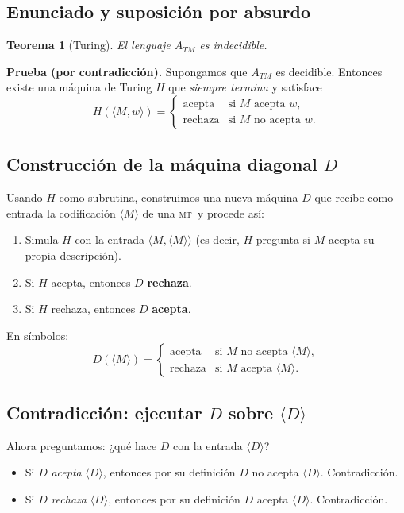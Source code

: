 \documentclass[11pt,a4paper]{article}
\theoremstyle{definicion}
\newtheorem{teorema}[definicion]{Teorema}
\newcommand{\MT}{\textsc{mt}}
\newcommand{\enc}[1]{\langle #1 \rangle}
\begin{document}
\subsection{Enunciado y suposición por absurdo}

\begin{teorema}[Turing]
El lenguaje $A_{TM}$ es indecidible.
\end{teorema}

\textbf{Prueba (por contradicción).} Supongamos que $A_{TM}$ es decidible. Entonces existe una máquina de Turing $H$ que \emph{siempre termina} y satisface
\[
H(\enc{M, w}) = \begin{cases} \text{acepta} & \text{si } M \text{ acepta } w, \\ \text{rechaza} & \text{si } M \text{ no acepta } w. \end{cases}
\]

\subsection{Construcción de la máquina diagonal $D$}

Usando $H$ como subrutina, construimos una nueva máquina $D$ que recibe como entrada la codificación $\enc{M}$ de una \MT\ y procede así:
\begin{enumerate}
    \item Simula $H$ con la entrada $\enc{M, \enc{M}}$ (es decir, $H$ pregunta si $M$ acepta su propia descripción).
    \item Si $H$ acepta, entonces $D$ \textbf{rechaza}.
    \item Si $H$ rechaza, entonces $D$ \textbf{acepta}.
\end{enumerate}

En símbolos:
\[
D(\enc{M}) = \begin{cases} \text{acepta} & \text{si } M \text{ no acepta } \enc{M}, \\ \text{rechaza} & \text{si } M \text{ acepta } \enc{M}. \end{cases}
\]

\subsection{Contradicción: ejecutar $D$ sobre $\enc{D}$}

Ahora preguntamos: ¿qué hace $D$ con la entrada $\enc{D}$?
\begin{itemize}
    \item Si $D$ \emph{acepta} $\enc{D}$, entonces por su definición $D$ no acepta $\enc{D}$. Contradicción.
    \item Si $D$ \emph{rechaza} $\enc{D}$, entonces por su definición $D$ acepta $\enc{D}$. Contradicción.
\end{itemize}
\end{document}
